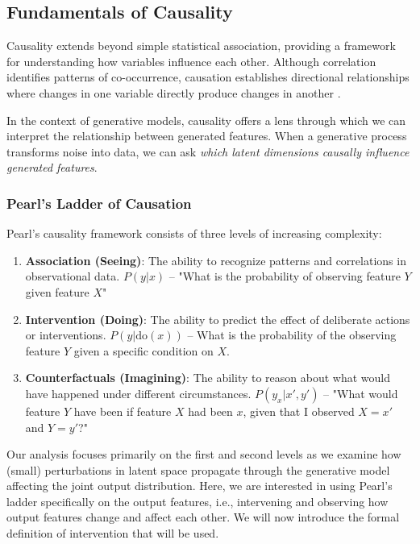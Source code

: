 \subsection{Fundamentals of Causality}
Causality extends beyond simple statistical association, providing a framework for understanding how variables influence each other. Although correlation identifies patterns of co-occurrence, causation establishes directional relationships where changes in one variable directly produce changes in another \cite{pearl2009causality}.

In the context of generative models, causality offers a lens through which we can interpret the relationship between generated features. When a generative process transforms noise into data, we can ask \emph{which latent dimensions causally influence generated features}.

\subsubsection{Pearl's Ladder of Causation}
Pearl's causality framework consists of three levels of increasing complexity:
\cite{pearl2018book}

\begin{enumerate}
    \itemsep0em
    \item
    \textbf{Association (Seeing)}: The ability to recognize patterns and correlations in observational data.
    $P(y|x)$ -- "What is the probability of observing feature $Y$ given feature $X$"
    \item \textbf{Intervention (Doing)}: The ability to predict the effect of deliberate actions or interventions.
   $P(y|\mathrm{do}(x))$ -- What is the probability of the observing feature $Y$ given a specific condition on $X$.
   \item \textbf{Counterfactuals (Imagining)}: The ability to reason about what would have happened under different circumstances.
   $P(y_x | x', y')$ -- "What would feature $Y$ have been if feature $X$ had been $x$, given that I observed $X=x'$ and $Y=y'$?"
\end{enumerate}

Our analysis focuses primarily on the first and second levels as we examine how (small) perturbations in latent space propagate through the generative model affecting the joint output distribution. Here, we are interested in using Pearl's ladder specifically on the output features, i.e., intervening and observing how output features change and affect each other. We will now introduce the formal definition of intervention that will be used.


